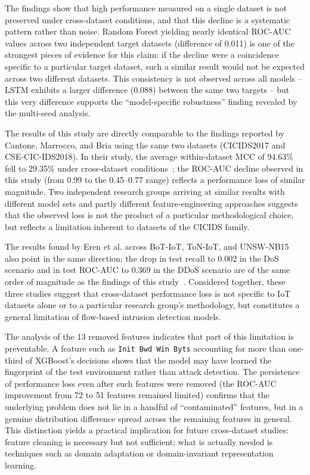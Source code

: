 \documentclass[a4paper,fleqn]{cas-sc}
\begin{document}
The findings show that high performance measured on a single dataset is not preserved under cross-dataset conditions, and that this decline is a systematic pattern rather than noise. Random Forest yielding nearly identical ROC-AUC values across two independent target datasets (difference of 0.011) is one of the strongest pieces of evidence for this claim: if the decline were a coincidence specific to a particular target dataset, such a similar result would not be expected across two different datasets. This consistency is not observed across all models -- LSTM exhibits a larger difference (0.088) between the same two targets -- but this very difference supports the ``model-specific robustness'' finding revealed by the multi-seed analysis.

The results of this study are directly comparable to the findings reported by Cantone, Marrocco, and Bria using the same two datasets (CICIDS2017 and CSE-CIC-IDS2018). In their study, the average within-dataset MCC of 94.63\% fell to 29.35\% under cross-dataset conditions~\cite{Cantone2024}; the ROC-AUC decline observed in this study (from 0.99 to the 0.45--0.77 range) reflects a performance loss of similar magnitude. Two independent research groups arriving at similar results with different model sets and partly different feature-engineering approaches suggests that the observed loss is not the product of a particular methodological choice, but reflects a limitation inherent to datasets of the CICIDS family.

The results found by Eren et al. across BoT-IoT, ToN-IoT, and UNSW-NB15 also point in the same direction; the drop in test recall to 0.002 in the DoS scenario and in test ROC-AUC to 0.369 in the DDoS scenario are of the same order of magnitude as the findings of this study~\cite{Eren2026}. Considered together, these three studies suggest that cross-dataset performance loss is not specific to IoT datasets alone or to a particular research group's methodology, but constitutes a general limitation of flow-based intrusion detection models.

The analysis of the 13 removed features indicates that part of this limitation is preventable. A feature such as \texttt{Init Bwd Win Byts} accounting for more than one-third of XGBoost's decisions shows that the model may have learned the fingerprint of the test environment rather than attack detection. The persistence of performance loss even after such features were removed (the ROC-AUC improvement from 72 to 51 features remained limited) confirms that the underlying problem does not lie in a handful of ``contaminated'' features, but in a genuine distribution difference spread across the remaining features in general. This distinction yields a practical implication for future cross-dataset studies: feature cleaning is necessary but not sufficient; what is actually needed is techniques such as domain adaptation or domain-invariant representation learning.
\end{document}
